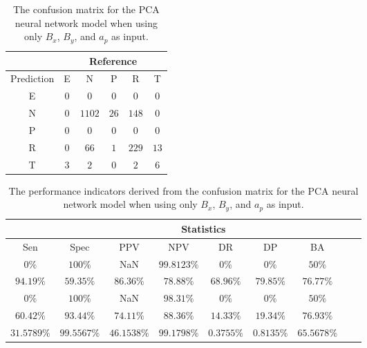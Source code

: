 \begin{table}[!ht]
	\centering
	\begin{tabular}{|c|c|c|c|c|c|}
		\hline
		 & \multicolumn{5}{|c|}{Reference} \\ \hline
		 Prediction & E & N & P & R & T \\ \hline
		 E & $0$ & $0$ & $0$ & $0$ & $0$ \\ \hline
		 N & $0$ & $1102$ & $26$ & $148$ & $0$ \\ \hline
		 P & $0$ & $0$ & $0$ & $0$ & $0$ \\ \hline
		 R & $0$ & $66$ & $1$ & $229$ & $13$ \\ \hline
		 T & $3$ & $2$ & $0$ & $2$ & $6$ \\ \hline
	\end{tabular}
	\caption{The confusion matrix for the PCA neural network model when using only $B_{x}$, $B_{y}$, and $a_{p}$ as input.}
	\label{tab:cm:xyap:pcaNNet}
\end{table}

\begin{table}[!ht]
	\centering
	\begin{tabular}{|c|c|c|c|c|c|c|c|c|}
		\hline
		 & \multicolumn{7}{c|}{Statistics} \\ \hline
		Sen & Spec & PPV & NPV & DR & DP & BA \\ \hline
		$0\%$ & $100\%$ & NaN & $99.8123\%$ & $0\%$ & $0\%$ & $50\%$ \\ \hline
		$94.19\%$ & $59.35\%$ & $86.36\%$ & $78.88\%$ & $68.96\%$ & $79.85\%$ & $76.77\%$ \\ \hline
		$0\%$ & $100\%$ & NaN & $98.31\%$ & $0\%$ & $0\%$ & $50\%$ \\ \hline
		$60.42\%$ & $93.44\%$ & $74.11\%$ & $88.36\%$ & $14.33\%$ & $19.34\%$ & $76.93\%$ \\ \hline
		$31.5789\%$ & $99.5567\%$ & $46.1538\%$ & $99.1798\%$ & $0.3755\%$ & $0.8135\%$ & $65.5678\%$ \\ \hline
	\end{tabular}
	\caption{The performance indicators derived from the confusion matrix for the PCA neural network model when using only $B_{x}$, $B_{y}$, and $a_{p}$ as input.}
	\label{tab:cs:xyap:pcaNNet}
\end{table}
